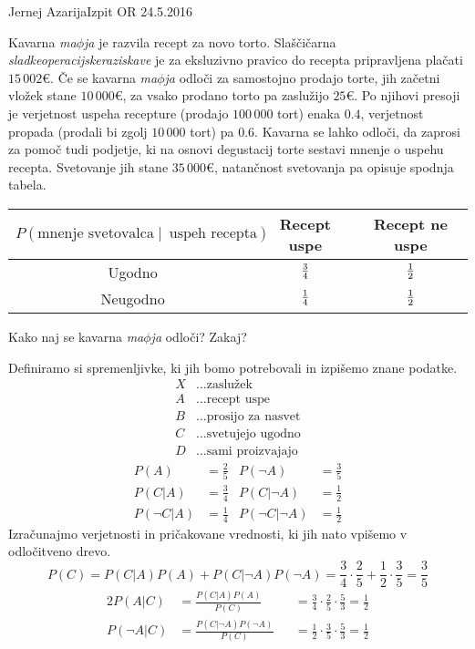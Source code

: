 \begin{naloga}{Jernej Azarija}{Izpit OR 24.5.2016}
\begin{vprasanje}
Kavarna {\em ma$\phi$ja} je razvila recept za novo torto.
Slaščičarna {\em sladkeoperacijskeraziskave}
je za eksluzivno pravico do recepta pripravljena plačati $15\,002 €$.
Če se kavarna {\em ma$\phi$ja} odloči za samostojno prodajo torte,
jih začetni vložek stane $10\,000 €$,
za vsako prodano torto pa zaslužijo $25 €$.
Po njihovi presoji
je verjetnost uspeha recepture (prodajo $100\,000$ tort) enaka $0.4$,
verjetnost propada (prodali bi zgolj $10\,000$ tort) pa $0.6$.
Kavarna se lahko odloči, da zaprosi za pomoč tudi pod\-jet\-je,
ki na osnovi degustacij torte sestavi mnenje o uspehu recepta.
Svetovanje jih stane $35\,000 €$,
natančnost svetovanja pa opisuje spodnja tabela.
\begin{center}
\begin{tabular}{c|cc}
$P(\text{mnenje svetovalca} \;|\;\ \text{uspeh recepta})$
& Recept uspe & Recept ne uspe \\ \hline
Ugodno   & ${3 \over 4}$ & ${1 \over 2}$ \\
Neugodno & ${1 \over 4}$ & ${1 \over 2}$
\end{tabular}
\end{center}
Kako naj se kavarna {\em ma$\phi$ja} odloči?
Zakaj?
\end{vprasanje}
\begin{odgovor}

    Definiramo si spremenljivke, ki jih bomo potrebovali in izpišemo znane podatke.
    \begin{align*}
    X &\dots \text{zaslužek}\\
    A &\dots \text{recept uspe}\\
    B &\dots \text{prosijo za nasvet}\\
    C &\dots \text{svetujejo ugodno}\\
    D &\dots \text{sami proizvajajo}
    \end{align*}
    \begin{align*}
    P(A) &= \frac{2}{5} & P(\neg A)& = \frac{3}{5}\\
    P(C|A)& = \frac{3}{4}  &P(C|\neg A) &= \frac{1}{2}\\
    P(\neg C|A) &= \frac{1}{4}  &P(\neg C| \neg A) &= \frac{1}{2}
    \end{align*}
    Izračunajmo verjetnosti in pričakovane vrednosti, ki jih nato vpišemo v odločitveno drevo.
    $$
    P(C) = P(C|A) P(A) + P(C|\neg A) P(\neg A) =\frac{3}{4}\cdot \frac{2}{5} + \frac{1}{2}\cdot \frac{3}{5} = \frac{3}{5}
    $$
    \begin{alignat*}{2}
    P(A|C) &= \frac{P(C|A)P(A)}{P(C)} &&= \frac{3}{4}\cdot \frac{2}{5}\cdot \frac{5}{3}=\frac{1}{2}\\
    P(\neg A|C) &= \frac{P(C|\neg A)P(\neg A)}{P(C)} &&= \frac{1}{2}\cdot \frac{3}{5}\cdot \frac{5}{3}= \frac{1}{2}
    \end{alignat*}
    

\end{odgovor}
\end{naloga}
